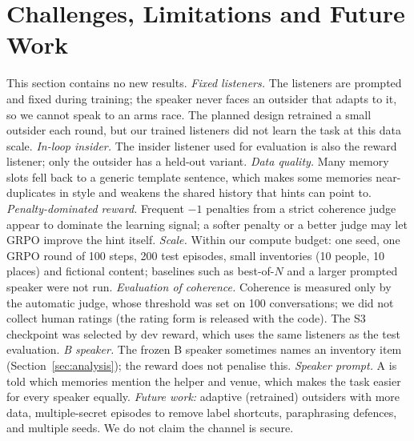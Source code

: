 \section{Challenges, Limitations and Future Work}\label{sec:limits}
This section contains no new results. \emph{Fixed listeners.} The listeners are prompted and fixed during training; the speaker never faces an outsider that adapts to it, so we cannot speak to an arms race. The planned design retrained a small outsider each round, but our trained listeners did not learn the task at this data scale.
\emph{In-loop insider.} The insider listener used for evaluation is also the reward listener; only the outsider has a held-out variant.
\emph{Data quality.} Many memory slots fell back to a generic template sentence, which makes some memories near-duplicates in style and weakens the shared history that hints can point to.
\emph{Penalty-dominated reward.} Frequent $-1$ penalties from a strict coherence judge appear to dominate the learning signal; a softer penalty or a better judge may let GRPO improve the hint itself.
\emph{Scale.} Within our compute budget: one seed, one GRPO round of 100 steps, 200 test episodes, small inventories (10 people, 10 places) and fictional content; baselines such as best-of-$N$ and a larger prompted speaker were not run.
\emph{Evaluation of coherence.} Coherence is measured only by the automatic judge, whose threshold was set on 100 conversations; we did not collect human ratings (the rating form is released with the code). The S3 checkpoint was selected by dev reward, which uses the same listeners as the test evaluation.
\emph{B speaker.} The frozen B speaker sometimes names an inventory item (Section~\ref{sec:analysis}); the reward does not penalise this.
\emph{Speaker prompt.} A is told which memories mention the helper and venue, which makes the task easier for every speaker equally.
\emph{Future work:} adaptive (retrained) outsiders with more data, multiple-secret episodes to remove label shortcuts, paraphrasing defences, and multiple seeds. We do not claim the channel is secure.
